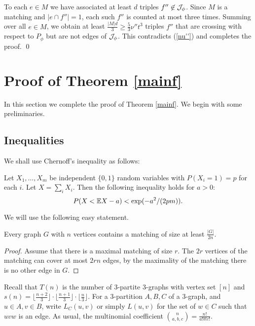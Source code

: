 \documentclass[11pt]{article}
\begin{document}
To each $e \in M$ we have associated at least $d$ triples  $f''\not\in {\cal J}_{\phi}$.
Since $M$ is a matching and $|e \cap f''| = 1$, each such $f''$ is counted at most three times.
Summing over all $e\in M$, we obtain at least $\frac{|M|d}{3}\ge \frac{5}{3}\nu'' t^3$ triples $f''$ that are crossing with
 respect to $P_{\phi}$ but are not edges of ${\cal J}_{\phi}$.  This contradicts (\ref{nu''}) and completes the proof. \qed



\section{Proof of Theorem \ref{mainf}}\label{proofmain}
In this section we complete the proof of Theorem \ref{mainf}. We
begin with some preliminaries.


 \subsection{Inequalities}
We shall use Chernoff's inequality as follows:

\begin{theorem}\label{chernoff}
Let $X_1,\ldots,X_m$ be independent $\{0,1\}$ random variables with
$P(X_i=1)=p$ for each $i$. Let $X=\sum_i X_i$. Then the following
inequality holds for
$a>0$:\\
$$P(X < {\mathbb E} X - a) < \exp(-a^2/(2pm)).$$
\end{theorem}

We will use the following easy statement.

\begin{lemma}\label{matching}
Every graph $G$ with $n$ vertices contains a matching of size at
least $\frac{|G|}{2n}$.
\end{lemma}

\begin{proof}
Assume that there is a maximal matching of size $r$. The $2r$
vertices of the matching can cover at most $2rn$ edges, by the
maximality of the matching there is no other edge in $G$.
\end{proof}

Recall that $T(n)$ is the number of $3$-partite $3$-graphs with vertex set $[n]$ and $s(n)=\lfloor\frac{n+2}{3}\rfloor\cdot \lfloor\frac{n+1}{3}\rfloor\cdot
\lfloor\frac{n}{3}\rfloor.$ For a 3-partition $A, B, C$ of a 3-graph, and $u \in A, v \in B$, write $L_C(u,v)$ or simply $L(u,v)$ for the set of $w \in C$ such that $uvw$ is an edge.
 As usual, the multinomial coefficient ${n \choose a,b,c}=\frac{n!}{a!b!c!}$.
\end{document}
